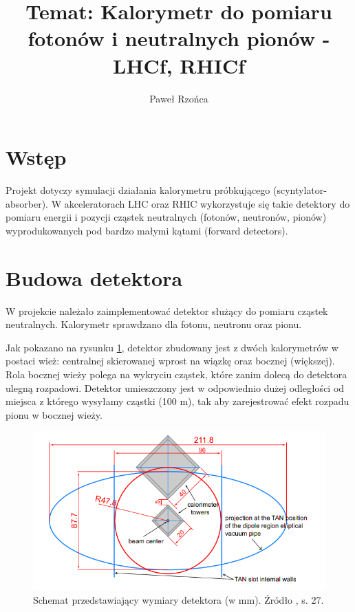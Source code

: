 \documentclass[11pt]{article}
\title{Temat: Kalorymetr do pomiaru fotonów i neutralnych pionów - LHCf,
RHICf}
\author{Paweł Rzońca}
\begin{document}
\maketitle

\section*{Wstęp}
Projekt dotyczy symulacji działania kalorymetru próbkującego (scyntylator-absorber). W akceleratorach
LHC oraz RHIC wykorzystuje się takie detektory do pomiaru energii i pozycji
cząstek neutralnych (fotonów, neutronów, pionów) wyprodukowanych pod bardzo małymi kątami (forward detectors).



\section*{Budowa detektora}
W projekcie należało zaimplementować detektor służący do pomiaru cząstek neutralnych. Kalorymetr sprawdzano
dla fotonu, neutronu oraz pionu. 

Jak pokazano na rysunku \ref{rys1}, detektor zbudowany jest z dwóch kalorymetrów w postaci wież: centralnej 
skierowanej wprost na wiązkę oraz bocznej (większej). Rola bocznej wieży
polega na wykryciu cząstek, które zanim dolecą do detektora ulegną rozpadowi.
Detektor umieszczony jest w odpowiednio dużej odległości od miejsca 
z którego wysyłamy cząstki (100 m), tak aby zarejestrować efekt rozpadu pionu w bocznej wieży.

\begin{figure}
\begin{center}
\includegraphics[scale=0.8]{lhcc1.png}
\caption{Schemat przedstawiający wymiary detektora (w mm). Źródło \cite{1}, s. 27.}\label{rys1}
\end{center}
\end{figure}
\end{document}
